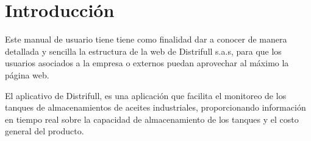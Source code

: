 \chapter{Introducci\'on}
Este manual de usuario tiene tiene como finalidad dar a conocer  de manera detallada y sencilla la estructura de la web de Distrifull s.a.s, para que los usuarios asociados a la empresa o externos puedan aprovechar al m\'aximo la p\'agina web.

El aplicativo de Distrifull, es una aplicaci\'on que facilita el monitoreo de los tanques de almacenamientos de aceites industriales, proporcionando informaci\'on en tiempo real sobre la capacidad de almacenamiento de los tanques y el costo general del producto.


